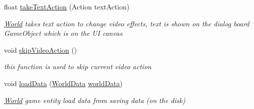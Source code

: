 \begin{DoxyCompactItemize}
float \hyperlink{class_world_ab411c201ddaf53d109dd5758fa2331f4}{take\+Text\+Action} (Action text\+Action)
\begin{DoxyCompactList}\small\item\em \hyperlink{class_world}{World} takes text action to change video effects, text is shown on the dialog board Game\+Object which is on the UI canvas \end{DoxyCompactList}\item 
void \hyperlink{class_world_a12235f6de623f070fa9947b51fda8f7b}{skip\+Video\+Action} ()
\begin{DoxyCompactList}\small\item\em this function is used to skip current video action \end{DoxyCompactList}\item 
void \hyperlink{class_world_a57146d033c4fca110b6bc6174e8fded4}{load\+Data} (\hyperlink{class_world_data}{World\+Data} \hyperlink{class_world_a1fbe122911090d8260c2adb3154948e9}{world\+Data})
\begin{DoxyCompactList}\small\item\em \hyperlink{class_world}{World} game entity load data from saving data (on the disk) \end{DoxyCompactList}\end{DoxyCompactItemize}
